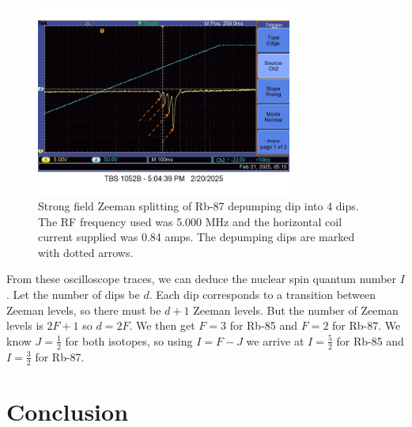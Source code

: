 \documentclass[12pt, letterpaper]{article}
\begin{document}
\begin{figure}[!h]
    \centering
    \includegraphics[width=0.75\textwidth]{experiment4/figures/rb87-strong.jpg}
    \caption{Strong field Zeeman splitting of Rb-87 depumping dip into 4 dips. The RF frequency used was 5.000 MHz and the horizontal coil current supplied was 0.84 amps. The depumping dips are marked with dotted arrows. }
    \label{fig:rb87strong}
\end{figure}

From these oscilloscope traces, we can deduce the nuclear spin quantum number $I$. Let the number of dips be $d$. Each dip corresponds to a transition between Zeeman levels, so there must be $d + 1$ Zeeman levels. But the number of Zeeman levels is $2F + 1$ so $d = 2F$. We then get $F = 3$ for Rb-85 and $F=2$ for Rb-87. We know $J=\frac{1}{2}$ for both isotopes, so using $I = F - J$ we arrive at $I = \frac{5}{2}$ for Rb-85 and $I = \frac{3}{2}$ for Rb-87. 

\section{Conclusion}
\end{document}
